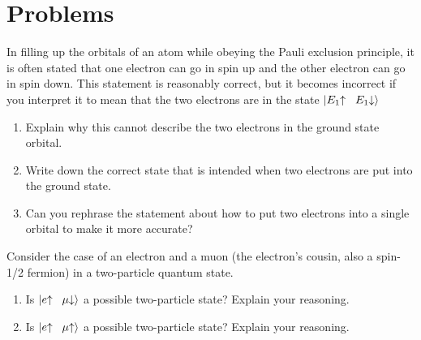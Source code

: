 \vfill

\newpage

\section*{Problems}

\begin{problem}
  In filling up the orbitals of an atom while obeying the Pauli
  exclusion principle, it is often stated that one
  electron can go in spin up and the other electron can go in spin
  down.  This statement is reasonably correct, but it becomes incorrect
  if you interpret it to mean that the two electrons are in the state
  $|E_1\hspace{-1mm}\uparrow \hspace{2mm} E_1\hspace{-1mm}\downarrow\rangle$
  \begin{enumerate}
  \item Explain why this cannot describe the two electrons in the
    ground state orbital.
  \item Write down the correct state that is intended when two
    electrons are put into the ground state.
  \item Can you rephrase the statement about how to put two electrons
    into a single orbital to make it more accurate?
  \end{enumerate}
\end{problem}

\begin{problem}
  Consider the case of an electron and a muon (the electron's cousin,
  also a spin-1/2 fermion) in a two-particle quantum state.
  \begin{enumerate}
  \item Is $|e\hspace{-1mm}\uparrow\hspace{2mm} \mu\hspace{-1mm}\downarrow\rangle$ a possible
    two-particle state?  Explain your reasoning.
  \item Is $|e\hspace{-1mm}\uparrow\hspace{2mm} \mu\hspace{-1mm}\uparrow\rangle$ a possible
    two-particle state?  Explain your reasoning.
  \end{enumerate}
\end{problem}

